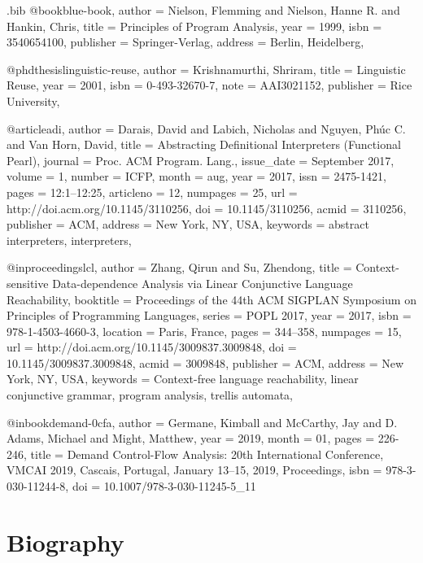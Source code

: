 \documentclass[12pt, oneside]{book}
\begin{document}
\begin{filecontents*}{\jobname.bib}
@book{blue-book,
  author = {Nielson, Flemming and Nielson, Hanne R. and Hankin, Chris},
  title = {Principles of Program Analysis},
  year = {1999},
  isbn = {3540654100},
  publisher = {Springer-Verlag},
  address = {Berlin, Heidelberg},
}

@phdthesis{linguistic-reuse,
  author = {Krishnamurthi, Shriram},
  title = {Linguistic Reuse},
  year = {2001},
  isbn = {0-493-32670-7},
  note = {AAI3021152},
  publisher = {Rice University},
}

@article{adi,
  author = {Darais, David and Labich, Nicholas and Nguyen, Ph\'{u}c C. and Van Horn, David},
  title = {Abstracting Definitional Interpreters (Functional Pearl)},
  journal = {Proc. ACM Program. Lang.},
  issue_date = {September 2017},
  volume = {1},
  number = {ICFP},
  month = aug,
  year = {2017},
  issn = {2475-1421},
  pages = {12:1--12:25},
  articleno = {12},
  numpages = {25},
  url = {http://doi.acm.org/10.1145/3110256},
  doi = {10.1145/3110256},
  acmid = {3110256},
  publisher = {ACM},
  address = {New York, NY, USA},
  keywords = {abstract interpreters, interpreters},
}

@inproceedings{lcl,
  author = {Zhang, Qirun and Su, Zhendong},
  title = {Context-sensitive Data-dependence Analysis via Linear Conjunctive Language Reachability},
  booktitle = {Proceedings of the 44th ACM SIGPLAN Symposium on Principles of Programming Languages},
  series = {POPL 2017},
  year = {2017},
  isbn = {978-1-4503-4660-3},
  location = {Paris, France},
  pages = {344--358},
  numpages = {15},
  url = {http://doi.acm.org/10.1145/3009837.3009848},
  doi = {10.1145/3009837.3009848},
  acmid = {3009848},
  publisher = {ACM},
  address = {New York, NY, USA},
  keywords = {Context-free language reachability, linear conjunctive grammar, program analysis, trellis automata},
}

@inbook{demand-0cfa,
  author = {Germane, Kimball and McCarthy, Jay and D. Adams, Michael and Might, Matthew},
  year = {2019},
  month = {01},
  pages = {226-246},
  title = {Demand Control-Flow Analysis: 20th International Conference, VMCAI 2019, Cascais, Portugal, January 13–15, 2019, Proceedings},
  isbn = {978-3-030-11244-8},
  doi = {10.1007/978-3-030-11245-5_11}
}
\end{filecontents*}



\chapter{Biography}
\end{document}
